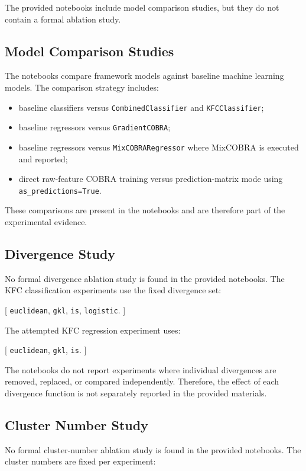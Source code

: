 The provided notebooks include model comparison studies, but they do not contain a formal ablation study.

\subsection{Model Comparison Studies}

The notebooks compare framework models against baseline machine learning models. The comparison strategy includes:

\begin{itemize}
    \item baseline classifiers versus \texttt{CombinedClassifier} and \texttt{KFCClassifier};
    \item baseline regressors versus \texttt{GradientCOBRA};
    \item baseline regressors versus \texttt{MixCOBRARegressor} where MixCOBRA is executed and reported;
    \item direct raw-feature COBRA training versus prediction-matrix mode using \texttt{as\_predictions=True}.
\end{itemize}

These comparisons are present in the notebooks and are therefore part of the experimental evidence.

\subsection{Divergence Study}

No formal divergence ablation study is found in the provided notebooks. The KFC classification experiments use the fixed divergence set:

[
    {\texttt{euclidean}, \texttt{gkl}, \texttt{is}, \texttt{logistic}}.
]

The attempted KFC regression experiment uses:

[
    {\texttt{euclidean}, \texttt{gkl}, \texttt{is}}.
]

The notebooks do not report experiments where individual divergences are removed, replaced, or compared independently. Therefore, the effect of each divergence function is not separately reported in the provided materials.

\subsection{Cluster Number Study}

No formal cluster-number ablation study is found in the provided notebooks. The cluster numbers are fixed per experiment:

